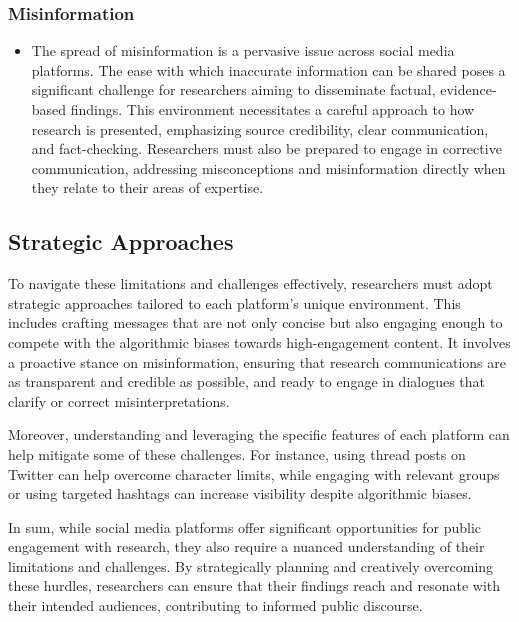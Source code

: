\documentclass[
]{book}
\providecommand{\tightlist}{%
  \setlength{\itemsep}{0pt}\setlength{\parskip}{0pt}}
\begin{document}
\hypertarget{misinformation}{%
\subsubsection*{Misinformation}\label{misinformation}}

\begin{itemize}
\tightlist
\item
  The spread of misinformation is a pervasive issue across social media platforms. The ease with which inaccurate information can be shared poses a significant challenge for researchers aiming to disseminate factual, evidence-based findings. This environment necessitates a careful approach to how research is presented, emphasizing source credibility, clear communication, and fact-checking. Researchers must also be prepared to engage in corrective communication, addressing misconceptions and misinformation directly when they relate to their areas of expertise.
\end{itemize}

\hypertarget{strategic-approaches}{%
\subsection*{Strategic Approaches}\label{strategic-approaches}}

To navigate these limitations and challenges effectively, researchers must adopt strategic approaches tailored to each platform's unique environment. This includes crafting messages that are not only concise but also engaging enough to compete with the algorithmic biases towards high-engagement content. It involves a proactive stance on misinformation, ensuring that research communications are as transparent and credible as possible, and ready to engage in dialogues that clarify or correct misinterpretations.

Moreover, understanding and leveraging the specific features of each platform can help mitigate some of these challenges. For instance, using thread posts on Twitter can help overcome character limits, while engaging with relevant groups or using targeted hashtags can increase visibility despite algorithmic biases.

In sum, while social media platforms offer significant opportunities for public engagement with research, they also require a nuanced understanding of their limitations and challenges. By strategically planning and creatively overcoming these hurdles, researchers can ensure that their findings reach and resonate with their intended audiences, contributing to informed public discourse.
\end{document}
